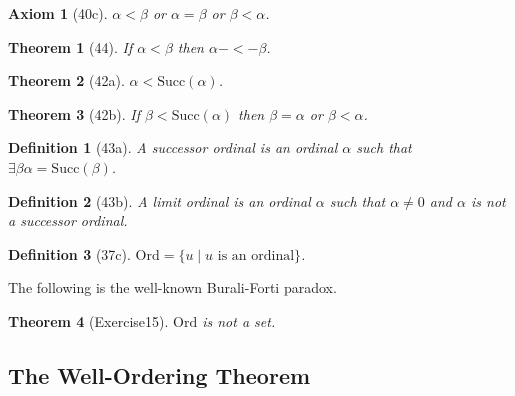 \documentclass{article}
\newenvironment{forthel}{\begin{leftbar}}{\end{leftbar}}
\newenvironment{proof}{\noindent\textbf{Proof\ }}{\hspace*{\fill}$\Box$\medskip}
\newtheorem{axiom}{Axiom}
\newtheorem{theorem}{Theorem}
\newtheorem{definition}{Definition}
\begin{document}
\begin{forthel}
\begin{axiom}[40c] $\alpha < \beta$ or $\alpha = \beta$ 
or $\beta < \alpha$.
\end{axiom}

\begin{theorem}[44] If $\alpha < \beta$ then $\alpha -<- \beta$. 
\end{theorem}

\begin{theorem}[42a] $\alpha < \mathrm{Succ}(\alpha)$.
\end{theorem}

\begin{theorem}[42b] If $\beta < \mathrm{Succ}(\alpha)$ 
then $\beta = \alpha$ or $\beta < \alpha$.
\end{theorem}

\begin{definition}[43a] A \emph{successor ordinal} is 
an ordinal $\alpha$ such that
$\exists \beta  \alpha = \mathrm{Succ}(\beta)$.
\end{definition}

\begin{definition}[43b] A \emph{limit ordinal} is an ordinal
$\alpha$ such that
$\alpha \neq 0$ and 
$\alpha$ is not a successor ordinal.
\end{definition}

\begin{definition}[37c] $\mathrm{Ord} = 
\{u \mid u \text{ is an ordinal}\}$.
\end{definition}
\end{forthel}

The following is the well-known Burali-Forti paradox.

\begin{forthel}

\begin{theorem}[Exercise15] $\mathrm{Ord}$ is not a set.
\end{theorem}
\end{forthel}

\subsection{The Well-Ordering Theorem}
\end{document}
